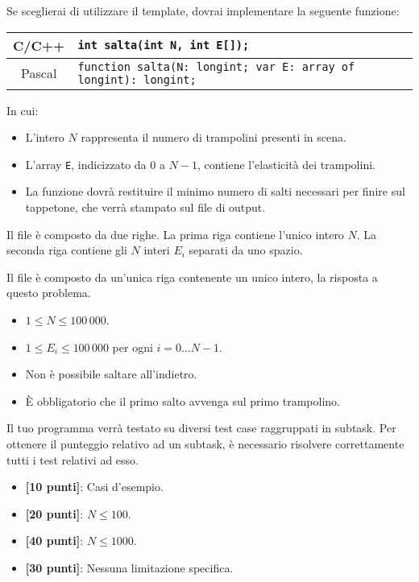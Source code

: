 Se sceglierai di utilizzare il template, dovrai implementare la seguente funzione:
\begin{center}\begin{tabularx}{\textwidth}{|c|X|}
\hline
C/C++  & \verb|int salta(int N, int E[]);|\\
\hline
Pascal & \verb|function salta(N: longint; var E: array of longint): longint;|\\
\hline
\end{tabularx}\end{center}
In cui:
\begin{itemize}[nolistsep]
  \item L'intero $N$ rappresenta il numero di trampolini presenti in scena.
  \item L'array \texttt{E}, indicizzato da $0$ a $N-1$, contiene l'elasticità dei trampolini.
  \item La funzione dovrà restituire il minimo numero di salti necessari per finire sul tappetone, che verrà stampato sul file di output.
\end{itemize}

\InputFile
Il file  è composto da due righe. La prima riga contiene l'unico intero $N$. La seconda riga contiene gli $N$ interi $E_i$ separati da uno spazio.

\OutputFile
Il file \outputfile{} è composto da un'unica riga contenente un unico intero, la risposta a questo problema.

\pagebreak
\Constraints
\begin{itemize}[nolistsep, itemsep=2mm]
	\item $1 \le N \le 100\,000$.
	\item $1 \le E_i \le 100\,000$ per ogni $i=0\ldots N-1$.
	\item Non è possibile saltare all'indietro.
	\item È obbligatorio che il primo salto avvenga sul primo trampolino.
\end{itemize}

\Scoring
Il tuo programma verrà testato su diversi test case raggruppati in subtask.
Per ottenere il punteggio relativo ad un subtask, è necessario risolvere
correttamente tutti i test relativi ad esso.

\begin{itemize}[nolistsep,itemsep=2mm]
  \item \textbf{ [10 punti]}: Casi d'esempio.
  \item \textbf{ [20 punti]}: $N \leq 100$.
  \item \textbf{ [40 punti]}: $N \leq 1000$.
  \item \textbf{ [30 punti]}: Nessuna limitazione specifica.
\end{itemize}

